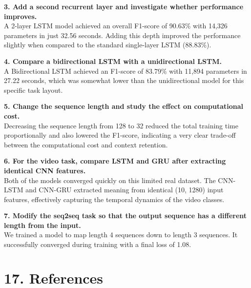 \documentclass[10pt]{article}
\begin{document}
\vspace{0.15cm}
\textbf{3. Add a second recurrent layer and investigate whether performance improves.} \\
A 2-layer LSTM model achieved an overall F1-score of 90.63\% with 14,326 parameters in just 32.56 seconds. Adding this depth improved the performance slightly when compared to the standard single-layer LSTM (88.83\%).

\vspace{0.15cm}
\textbf{4. Compare a bidirectional LSTM with a unidirectional LSTM.} \\
A Bidirectional LSTM achieved an F1-score of 83.79\% with 11,894 parameters in 27.22 seconds, which was somewhat lower than the unidirectional model for this specific task layout.

\vspace{0.15cm}
\textbf{5. Change the sequence length and study the effect on computational cost.} \\
Decreasing the sequence length from 128 to 32 reduced the total training time proportionally and also lowered the F1-score, indicating a very clear trade-off between the computational cost and context retention.

\vspace{0.15cm}
\textbf{6. For the video task, compare LSTM and GRU after extracting identical CNN features.} \\
Both of the models converged quickly on this limited real dataset. The CNN-LSTM and CNN-GRU extracted meaning from identical (10, 1280) input features, effectively capturing the temporal dynamics of the video classes.

\vspace{0.15cm}
\textbf{7. Modify the seq2seq task so that the output sequence has a different length from the input.} \\
We trained a model to map length 4 sequences down to length 3 sequences. It successfully converged during training with a final loss of 1.08.

\section*{17. References}
\end{document}
